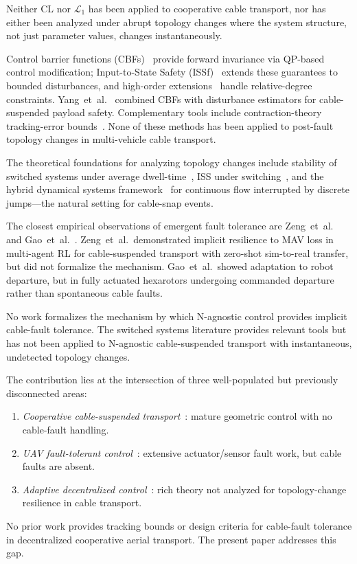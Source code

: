Neither CL nor $\mathcal{L}_1$ has been applied to cooperative cable transport, nor has either been analyzed under abrupt topology changes where the system structure, not just parameter values, changes instantaneously.

Control barrier functions (CBFs)~\cite{ames2017control} provide forward invariance via QP-based control modification; Input-to-State Safety (ISSf)~\cite{kolathaya2019input} extends these guarantees to bounded disturbances, and high-order extensions~\cite{xiao2022control} handle relative-degree constraints. Yang~et~al.~\cite{yang2025robust} combined CBFs with disturbance estimators for cable-suspended payload safety. Complementary tools include contraction-theory tracking-error bounds~\cite{manchester2017control}. None of these methods has been applied to post-fault topology changes in multi-vehicle cable transport.

The theoretical foundations for analyzing topology changes include stability of switched systems under average dwell-time~\cite{hespanha1999stability}, ISS under switching~\cite{vu2007iss}, and the hybrid dynamical systems framework~\cite{goebel2012hybrid} for continuous flow interrupted by discrete jumps---the natural setting for cable-snap events.

The closest empirical observations of emergent fault tolerance are Zeng~et~al.~\cite{zeng2025decentralized} and Gao~et~al.~\cite{gao2024decentralized}. Zeng~et~al.~demonstrated implicit resilience to MAV loss in multi-agent RL for cable-suspended transport with zero-shot sim-to-real transfer, but did not formalize the mechanism. Gao~et~al.~showed adaptation to robot departure, but in fully actuated hexarotors undergoing commanded departure rather than spontaneous cable faults.

No work formalizes the mechanism by which N-agnostic control provides implicit cable-fault tolerance. The switched systems literature provides relevant tools but has not been applied to N-agnostic cable-suspended transport with instantaneous, undetected topology changes.

The contribution lies at the intersection of three well-populated but previously disconnected areas:

\begin{enumerate}[label=(\roman*),nosep]
  \item \emph{Cooperative cable-suspended transport}~\cite{lee2010geometric,sreenath2013geometric,lee2018geometric,sun2025agile,estevez2024review}: mature geometric control with no cable-fault handling.
  \item \emph{UAV fault-tolerant control}~\cite{sun2020incremental,adaika2025fdd,zhang2024fault}: extensive actuator/sensor fault work, but cable faults are absent.
  \item \emph{Adaptive decentralized control}~\cite{chowdhary2010concurrent,cao2010l1book,wu2025l1quad,gao2024decentralized}: rich theory not analyzed for topology-change resilience in cable transport.
\end{enumerate}

No prior work provides tracking bounds or design criteria for cable-fault tolerance in decentralized cooperative aerial transport. The present paper addresses this gap.
